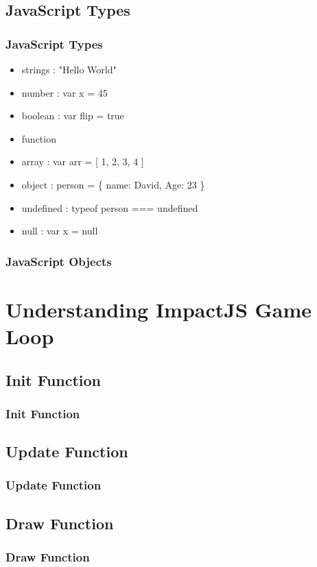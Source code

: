 \documentclass[red]{beamer}
\begin{document}
\subsection{JavaScript Types}

\begin{frame}
	\frametitle{JavaScript Types}
	 \begin{itemize}
  		\item<1-> strings : "Hello World"
 		\item<2-> number : var x = 45
 		\item<3-> boolean : var flip = true
		\item<4-> function
		\item<4-> array : var arr = [ 1, 2, 3, 4 ]
		\item<5->object : person = \{ name: David, Age: 23 \}
		\item<6->undefined : typeof person === undefined
		\item<7->null : var x = null
 	 \end{itemize}
\end{frame}

\begin{frame}
 	\frametitle{JavaScript Objects}
		\lstI
\end{frame}

\section{Understanding ImpactJS Game Loop}

\subsection{Init Function}

\begin{frame}
	\frametitle{Init Function}
		\lstll
\end{frame}

\subsection{Update Function}
\begin{frame}
	\frametitle{Update Function}
		\lstlll
\end{frame}

\subsection{Draw Function}
\begin{frame}
	\frametitle{Draw Function}
		\lstllll
\end{frame}
\end{document}
